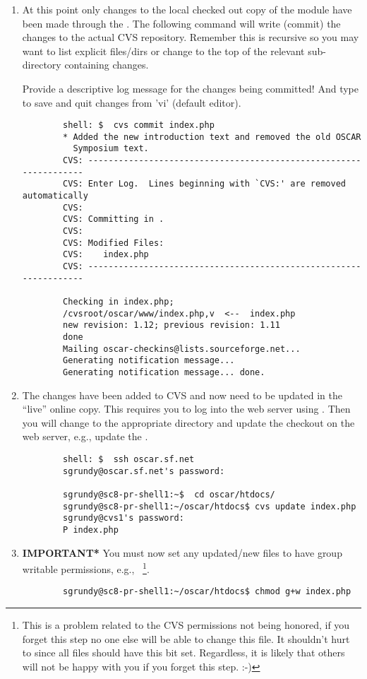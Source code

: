 \begin{enumerate}
	\item At this point only changes to the local checked out copy of the
	module have been made through the .  The following
	command will write (commit) the changes to the actual CVS repository.
	Remember this is recursive so you may want to list explicit files/dirs
	or change to the top of the relevant sub-directory containing changes.

	Provide a descriptive log message for the changes being committed!  And
	type  to save and quit changes from 'vi' (default editor).
	\begin{verbatim}
		shell: $  cvs commit index.php
		* Added the new introduction text and removed the old OSCAR
		  Symposium text.
		CVS: ------------------------------------------------------------------
		CVS: Enter Log.  Lines beginning with `CVS:' are removed automatically
		CVS:
		CVS: Committing in .
		CVS:
		CVS: Modified Files:
		CVS:    index.php
		CVS: ------------------------------------------------------------------

		Checking in index.php;
		/cvsroot/oscar/www/index.php,v  <--  index.php
		new revision: 1.12; previous revision: 1.11
		done
		Mailing oscar-checkins@lists.sourceforge.net...
		Generating notification message...
		Generating notification message... done.
	\end{verbatim}

	\item The changes have been added to CVS and now need to be updated in
	the ``live'' online copy.  This requires you to log into the web server
	using .  Then you will change to the appropriate directory and
	update the checkout on the web server, e.g., update the .
	\begin{verbatim}
		shell: $  ssh oscar.sf.net
		sgrundy@oscar.sf.net's password:

		sgrundy@sc8-pr-shell1:~$  cd oscar/htdocs/
		sgrundy@sc8-pr-shell1:~/oscar/htdocs$ cvs update index.php
		sgrundy@cvs1's password: 
		P index.php
	\end{verbatim}

	\item {\bf *IMPORTANT*} You must now set any updated/new files to have
	group writable permissions, e.g., ~\footnote{This is a
	problem related to the CVS permissions not being honored, if you forget
	this step no one else will be able to change this file.  It shouldn't
	hurt to  since all files should have this bit set.
	Regardless, it is likely that others will not be happy with you if you
	forget this step. :-)}.
	\begin{verbatim}
		sgrundy@sc8-pr-shell1:~/oscar/htdocs$ chmod g+w index.php
	\end{verbatim}

\end{enumerate}



